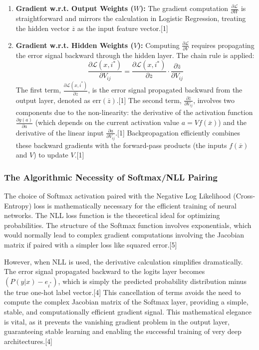 \documentclass{article}
\begin{document}
\begin{enumerate}
    \item \textbf{Gradient w.r.t. Output Weights ($W$):} The gradient computation $\frac{\partial\mathcal{L}}{\partial W}$ is straightforward and mirrors the calculation in Logistic Regression, treating the hidden vector $\overline{z}$ as the input feature vector.[1]
    \item \textbf{Gradient w.r.t. Hidden Weights ($V$):} Computing $\frac{\partial\mathcal{L}}{\partial V}$ requires propagating the error signal backward through the hidden layer. The chain rule is applied:
    $$\frac{\partial\mathcal{L}(x,i^{*})}{\partial V_{ij}}= \frac{\partial\mathcal{L}(x,i^{*})}{\partial \overline{z}} \cdot \frac{\partial \overline{z}}{\partial V_{ij}}$$
    The first term, $\frac{\partial\mathcal{L}(x,i^{*})}{\partial \overline{z}}$, is the error signal propagated backward from the output layer, denoted as $\text{err}(\overline{z})$.[1] The second term, $\frac{\partial \overline{z}}{\partial V_{ij}}$, involves two components due to the non-linearity: the derivative of the activation function $\frac{\partial g(a)}{\partial a}$ (which depends on the current activation value $a=Vf(\overline{x})$) and the derivative of the linear input $\frac{\partial a}{\partial V_{ij}}$.[1] Backpropagation efficiently combines these backward gradients with the forward-pass products (the inputs $f(\overline{x})$ and $V$) to update $V$.[1]
\end{enumerate}

\subsubsection{The Algorithmic Necessity of Softmax/NLL Pairing}

The choice of Softmax activation paired with the Negative Log Likelihood (Cross-Entropy) loss is mathematically necessary for the efficient training of neural networks. The NLL loss function is the theoretical ideal for optimizing probabilities. The structure of the Softmax function involves exponentials, which would normally lead to complex gradient computations involving the Jacobian matrix if paired with a simpler loss like squared error.[5]

However, when NLL is used, the derivative calculation simplifies dramatically. The error signal propagated backward to the logits layer becomes $(P(y|x) - e_{i^*})$, which is simply the predicted probability distribution minus the true one-hot label vector.[4] This cancellation of terms avoids the need to compute the complex Jacobian matrix of the Softmax layer, providing a simple, stable, and computationally efficient gradient signal. This mathematical elegance is vital, as it prevents the vanishing gradient problem in the output layer, guaranteeing stable learning and enabling the successful training of very deep architectures.[4]
\end{document}
